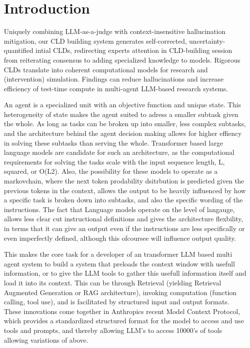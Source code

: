 \chapter{Introduction}

 Uniquely combining LLM-as-a-judge with context-insensitive hallucination mitigation,
 our CLD building system generates self-corrected, uncertainty-quantified intial CLDs,
 redirecting experts attention in CLD-building session from reiterating consensus to adding
 specialized knowledge to models. Rigorous CLDs translate into coherent computational
 models for research and (intervention) simulation. Findings can reduce hallucinations
 and increase efficiency of test-time compute in multi-agent LLM-based research systems.

 An agent is a specialized unit with an objective function and unique state. This heterogeneity of state makes the agent suited to adress a smaller subtask given the whole. As long as tasks can be broken up into smaller, less complex subtasks, and the architecture behind the agent decision making allows for higher effiency in solving these subtasks than serving the whole. Transformer based large language models are candidate for such an architecture, as the computational requirements for solving the tasks scale with the input sequence length, L, squared, or O(L2).
 Also, the possibility for these models to operate as a markovchain, where the next token prodability dsitrbution is predicted given the previous tokens in the context, allows the output to be heavily influenced by how a specific task is broken down into subtasks, and also the specific wording of the instructions. 
 The fact that Language models operate on the level of langauge, allows less clear cut instructional definitions and gives the architecture flexbility, in terms that it can give an output even if the instructions are less specifically or even imperfectly defined, although this ofcoursee will influence output quality.

 This makes the core task for a developer of an transformer LLM based multi agent system to build a system that preloads the context window with usefull information, or to give the LLM tools to gather this usefull information itself and load it into its context. This can be through Retrieval (yielding Retrieval Augmented Generation or RAG architecture), invoking computation (function calling, tool use), and is facilitated by structured input and output formats. These innovations come together in Anthropics recent Model Context Protocol, which provides a standardized structured format for the model to access and use tools and prompts, and thereby allowing LLM's to access 10000's of tools allowing variations of above.

